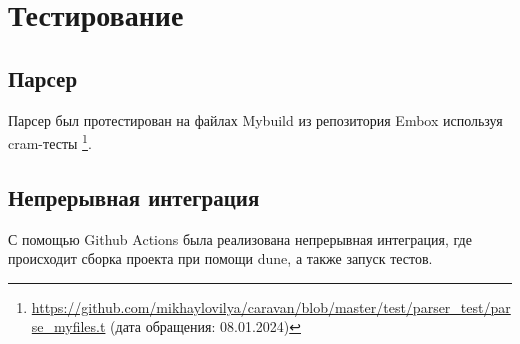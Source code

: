 
\section{Тестирование}
\subsection*{Парсер}
Парсер был протестирован на файлах Mybuild из репозитория Embox используя cram-тесты \footnote{\href{https://github.com/mikhaylovilya/caravan/blob/master/test/parser\_test/parse\_myfiles.t}{https://github.com/mikhaylovilya/caravan/blob/master/test/parser\_test/parse\_myfiles.t} (дата обращения: 08.01.2024)}.
\subsection*{Непрерывная интеграция}
С помощью Github Actions была реализована непрерывная интеграция, где происходит сборка проекта при помощи dune, а также запуск тестов.




